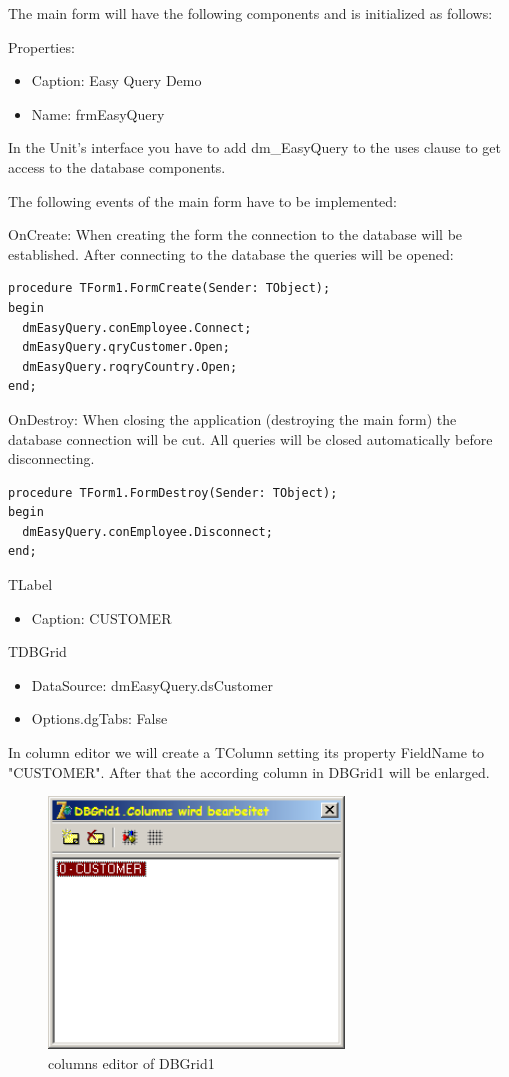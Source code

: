 \documentclass[a4paper,12pt,oneside]{book}
\begin{document}
The main form will have the following components and is initialized as follows:

Properties:
\begin{itemize}
  \item Caption: Easy Query Demo
  \item Name: frmEasyQuery
\end{itemize}

In the Unit's interface you have to add dm\_EasyQuery to the uses clause to get access to the database components.

The following events of the main form have to be implemented:

OnCreate:
When creating the form the connection to the database will be established.
After connecting to the database the queries will be opened:
\begin{verbatim}
procedure TForm1.FormCreate(Sender: TObject);
begin
  dmEasyQuery.conEmployee.Connect;
  dmEasyQuery.qryCustomer.Open;
  dmEasyQuery.roqryCountry.Open;
end;
\end{verbatim}

OnDestroy:
When closing the application (destroying the main form) the database connection will be cut.
All queries will be closed automatically before disconnecting.
\begin{verbatim}
procedure TForm1.FormDestroy(Sender: TObject);
begin
  dmEasyQuery.conEmployee.Disconnect;
end;
\end{verbatim}

TLabel
\begin{itemize}
  \item Caption: CUSTOMER
\end{itemize}

TDBGrid
\begin{itemize}
  \item DataSource: dmEasyQuery.dsCustomer
	\item Options.dgTabs: False
\end{itemize}

In column editor we will create a TColumn setting its property FieldName to "CUSTOMER".
After that the according column in DBGrid1 will be enlarged.

\begin{figure}[htbp] 
  \centering
  \includegraphics[width=0.7\textwidth]{ZeosTutorial/dbgrid1_columns.png}
  \caption{columns editor of DBGrid1}
  \label{fig:dbgrid1_columns}
\end{figure}
\end{document}
